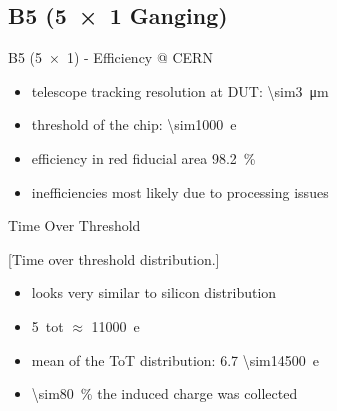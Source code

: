 \subsection{B5 (\SI{5x1}{} Ganging)}
\begin{frame}{B5 (\SI{5x1}{}) - Efficiency @ CERN}

	
	\begin{itemize}\itemfill
		\item telescope tracking resolution at DUT: \SI{\sim3}{\micro\meter}
		\item threshold of the chip: \SI{\sim1000}{e}
		\item efficiency in red fiducial area \SI{98.2}{\%}
		\item inefficiencies most likely due to processing issues
	\end{itemize}
	
\end{frame}
\begin{frame}{Time Over Threshold}

	[Time over threshold distribution.]	
	
	\begin{itemize}\itemfill
		\item looks very similar to silicon distribution
		\item \SI{5}{tot} $\approx$ \SI{11000}{e}
		\item mean of the ToT distribution: 6.7 \ra \SI{\sim14500}{e}
		\item \SI{\sim80}{\%} the induced charge was collected
	\end{itemize}
	
\end{frame}
